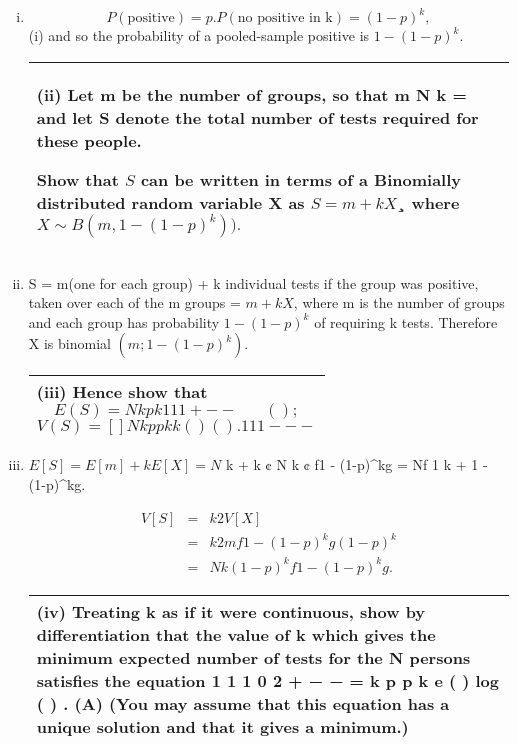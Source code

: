 \documentclass[a4paper,12pt]{article}
\begin{document}
\begin{enumerate}[(i)]
\item \[P(\mbox{positive})= p. P(\mbox{no positive in k})= (1-p)^k,\]
(i) and so the probability of a pooled-sample positive is $1 - (1-p)^k$.

  \begin{table}[ht!]
     \centering
     \begin{tabular}{|p{15cm}|}
     \hline  
(ii) Let m be the number of groups, so that m
N k = and let S denote the total number of
tests required for these people.  

Show that $S$ can be written  in terms of a Binomially
distributed random variable X as
$S = m+kX$¸  where $X  \sim B (m, 1-(1-p)^k)).$

 \\ \hline 
      \end{tabular}
    \end{table}

    
\item S = m(one for each group) + k individual tests if the group was positive,
taken over each of the m groups = $m+kX$, where m is the number of groups
and each group has probability $1 - (1-p)^k$ of requiring k tests.
Therefore X is binomial $(m; 1 - (1-p)^k)$.


  \begin{table}[ht!]
     \centering
     \begin{tabular}{|p{15cm}|}
     \hline 
(iii) Hence show that
\[E(S)           =  N
k
p k1 11 + − −
  
   ( ) ;                \]  
\[V(S)           =    [] Nk p p kk ( ) ( ) . 1 1 1 − − −\]
 \\ \hline 
      \end{tabular}
    \end{table}
\item $E[S] = E[m] + kE[X] = N$
k + k ¢ N
k ¢ f1 - (1-p)^kg = Nf 1
k + 1 - (1-p)^kg.

\begin{eqnarray*}
V [S] &=& k2V [X] \\ &=& k2mf1 - (1-p)^kg(1-p)^k \\ &=& Nk(1-p)^kf1 - (1-p)^kg.
\end{eqnarray*}
\newpage
  \begin{table}[ht!]
     \centering
     \begin{tabular}{|p{15cm}|}
     \hline  
(iv) Treating k as if it were continuous, show by differentiation that the value of k which gives the minimum expected number of tests for the N persons satisfies the equation
1 1 1 0 2 + − − = k p p k e ( ) log ( ) . (A)
(You may assume that this equation has a unique solution and that it gives a minimum.)
\\ \hline
      \end{tabular}
    \end{table}


\end{enumerate}
\end{document}
